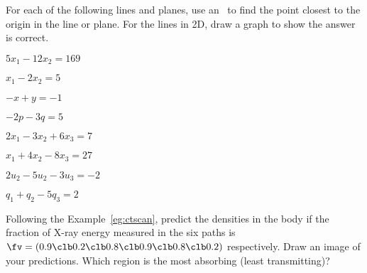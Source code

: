 
\begin{exercise} \label{ex:} 
For each of the following lines and planes,
use an \svd\ to find the point closest to the origin in the line or plane.
For the lines in 2D, draw a graph to show the answer is correct.
\begin{parts}
\item \(5x_1-12x_2=169\)

\item \(x_1-2x_2=5\)

\item \(-x+y=-1\)

\item \(-2p-3q=5\)

\item \(2x_1-3x_2+6x_3=7\)

\item \(x_1+4x_2-8x_3=27\)

\item \(2u_2-5u_2-3u_3=-2\)

\item \(q_1+q_2-5q_3=2\)

\end{parts}
\end{exercise}



\begin{exercise} \label{ex:} 
Following the  Example~\ref{eg:ctscan}, predict the densities in the body if the fraction of X-ray energy measured in the six paths is \(\fv=(0.9\clb 0.2\clb 0.8\clb 0.9\clb 0.8\clb 0.2)\) respectively.  
Draw an image of your predictions.  Which region is the most absorbing (least transmitting)?
\end{exercise}



